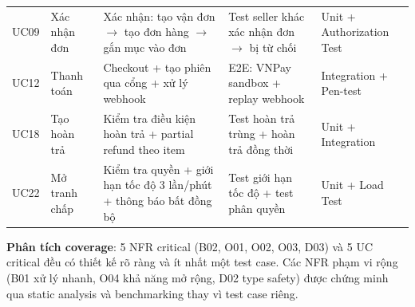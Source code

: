 \begin{longtable}{@{}L{1.3cm}L{3.5cm}L{4.2cm}L{3cm}L{2.3cm}@{}}
UC09 & Xác nhận đơn & Xác nhận: tạo vận đơn $\to$ tạo đơn hàng $\to$ gắn mục vào đơn & Test seller khác xác nhận đơn $\to$ bị từ chối & Unit + Authorization Test \\
UC12 & Thanh toán & Checkout + tạo phiên qua cổng + xử lý webhook & E2E: VNPay sandbox + replay webhook & Integration + Pen-test \\
UC18 & Tạo hoàn trả & Kiểm tra điều kiện hoàn trả + partial refund theo item & Test hoàn trả trùng + hoàn trả đồng thời & Unit + Integration \\
UC22 & Mở tranh chấp & Kiểm tra quyền + giới hạn tốc độ 3 lần/phút + thông báo bất đồng bộ & Test giới hạn tốc độ + test phân quyền & Unit + Load Test \\

\end{longtable}
\normalsize

\textbf{Phân tích coverage}: 5 NFR critical (B02, O01, O02, O03, D03) và 5 UC critical đều có thiết kế rõ ràng và ít nhất một test case. Các NFR phạm vi rộng (B01 xử lý nhanh, O04 khả năng mở rộng, D02 type safety) được chứng minh qua static analysis và benchmarking thay vì test case riêng.
